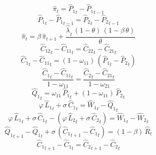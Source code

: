 \begin{dmath}
{{\hat{\pi}}}_{t}={{\hat{P}_{1}}}_{t}-{{\hat{P}_{1}}}_{t-1}
\end{dmath}
\begin{dmath}
{{\hat{P}_{1}}}_{t}-{{\hat{P}_{1}}}_{t-1}={{\hat{P}_{2}}}_{t}-{{\hat{P}_{2}}}_{t-1}
\end{dmath}
\begin{dmath}
{{\hat{\pi}}}_{t}={{\beta}}\, {{\hat{\pi}}}_{t+1}+\frac{{{\hat{\lambda}_{}}}_{t}\, \left(1-{{\theta}}\right)\, \left(1-{{\beta}}\, {{\theta}}\right)}{{{\theta}}}
\end{dmath}
\begin{dmath}
{{\hat{C}_{1 2}}}_{t}-{{\hat{C}_{1 1}}}_{t}={{\hat{C}_{2 2}}}_{t}-{{\hat{C}_{2 1}}}_{t}
\end{dmath}
\begin{dmath}
{{\hat{C}_{1}}}_{t}-{{\hat{C}_{1 1}}}_{t}=\left(1-{{\omega_{11}}}\right)\, \left({{\hat{P}_{1}}}_{t}-{{\hat{P}_{2}}}_{t}\right)
\end{dmath}
\begin{dmath}
\frac{{{\hat{C}_{1}}}_{t}-{{\hat{C}_{1 1}}}_{t}}{1-{{\omega_{11}}}}=\frac{{{\hat{C}_{2}}}_{t}-{{\hat{C}_{2 1}}}_{t}}{1-{{\omega_{21}}}}
\end{dmath}
\begin{dmath}
{{\hat{Q}_{1}}}_{t}={{\omega_{11}}}\, {{\hat{P}_{1}}}_{t}+\left(1-{{\omega_{11}}}\right)\, {{\hat{P}_{2}}}_{t}
\end{dmath}
\begin{dmath}
{{\varphi}}\, {{\hat{L}_{1}}}_{t}+{{\sigma}}\, {{\hat{C}_{1}}}_{t}={{\hat{W}_{1}}}_{t}-{{\hat{Q}_{1}}}_{t}
\end{dmath}
\begin{dmath}
{{\varphi}}\, {{\hat{L}_{1}}}_{t}+{{\sigma}}\, {{\hat{C}_{1}}}_{t}-\left({{\varphi}}\, {{\hat{L}_{2}}}_{t}+{{\sigma}}\, {{\hat{C}_{2}}}_{t}\right)={{\hat{W}_{1}}}_{t}-{{\hat{W}_{2}}}_{t}
\end{dmath}
\begin{dmath}
{{\hat{Q}_{1}}}_{t+1}-{{\hat{Q}_{1}}}_{t}+{{\sigma}}\, \left({{\hat{C}_{1}}}_{t+1}-{{\hat{C}_{1}}}_{t}\right)=\left(1-{{\beta}}\right)\, {{\hat{R}}}_{t}
\end{dmath}
\begin{dmath}
{{\hat{C}_{1}}}_{t+1}-{{\hat{C}_{1}}}_{t}={{\hat{C}_{2}}}_{t+1}-{{\hat{C}_{2}}}_{t}
\end{dmath}
